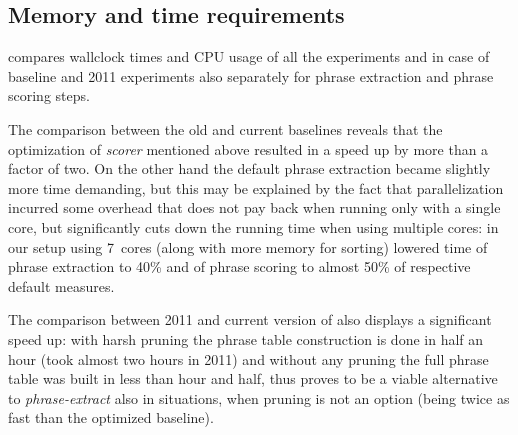 \subsection{Memory and time requirements}


 compares wallclock times and CPU usage of all the
experiments and in case of baseline and 2011 experiments also separately for phrase
extraction and phrase scoring steps.

The comparison between the old and current baselines reveals that the optimization of
\emph{scorer} mentioned above resulted in a speed up by more than a factor of two.
On the other hand the default phrase extraction became slightly more time demanding,
but this may be explained by the fact that parallelization incurred some overhead
that does not pay back when running only with a single core, but significantly cuts
down the running time when using multiple cores: in our setup using 7~cores (along with
more memory for sorting) lowered time of phrase extraction to 40\% and of phrase scoring
to almost 50\% of respective default measures.

The comparison between 2011 and current version of \eppex{} also displays a significant
speed up: with harsh pruning the phrase table construction is done in half an hour (took
almost two hours in 2011) and without any pruning the full phrase table was built in
less than hour and half, thus \eppex{} proves to be a viable alternative to
\emph{phrase-extract} also in situations, when pruning is not an option (being twice as
fast than the optimized baseline).

